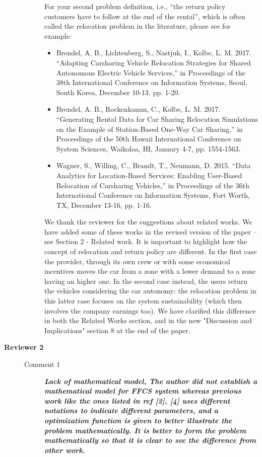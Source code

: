 \documentclass[letterpaper, 10pt]{elsarticle}
\newcommand{\rev}[1]{\textbf{\textit{#1}}}
\begin{document}
\begin{description}
\begin{description}
{For your second problem definition, i.e., ``the return policy customers have to follow at the end of the rental'', which is often called the relocation problem in the literature, please see for example:
\begin{itemize}
\item  Brendel, A. B., Lichtenberg, S., Nastjuk, I., Kolbe, L. M. 2017. ``Adapting Carsharing Vehicle Relocation 
Strategies for Shared Autonomous Electric Vehicle Services,'' in Proceedings of the 38th International Conference on Information Systems, Seoul, South Korea, December 10-13, pp. 1-20.
\item  Brendel, A. B., Rockenkamm, C., Kolbe, L. M. 2017. ``Generating Rental Data for Car Sharing Relocation Simulations on the Example of Station-Based One-Way Car Sharing,'' in Proceedings of the 50th Hawaii International Conference on System Sciences, Waikoloa, HI, January 4-7, pp. 1554-1563.
\item  Wagner, S., Willing, C., Brandt, T., Neumann, D. 2015. ``Data Analytics for Location-Based Services: Enabling User-Based Relocation of Carsharing Vehicles,'' in Proceedings of the 36th International Conference on Information Systems, Fort Worth, TX, December 13-16, pp. 1-16.
\end{itemize}
}

We thank the reviewer for the suggestions about related works. We have added some of these works in the revised version of the paper -- see Section 2 - Related work. It is important to highlight how the concept of relocation and return policy are different. In the first case the provider, through its own crew or with some economical incentives moves the car from a zone with a lower demand to a zone having an higher one. In the second case instead, the users return the vehicles considering the car autonomy: the relocation problem in this latter case focuses on the system sustainability (which then involves the company earnings too). We have clarified this difference in both the Related Works section, and in the new "Discussion and Implications" section 8 at the end of the paper.

\end{description}

\vspace{1cm}


 \item[\textbf{Reviewer 2}] \hfill
\begin{description}
\item[Comment 1] \rev{Lack of mathematical model, The author did not establish a mathematical model for FFCS system whereas previous work like the ones listed in ref [2], [4] uses different notations to indicate different parameters, and a optimization function is given to better illustrate the problem mathematically. It is better to form the problem mathematically so that it is clear to see the difference from other work.}


\end{description}
\end{description}
\end{document}
